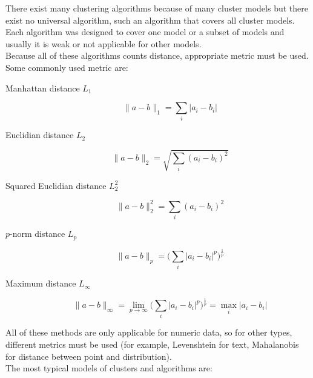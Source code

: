 There exist many clustering algorithms because of many cluster models but there exist no universal algorithm, such an algorithm that covers all cluster models. Each algorithm was designed to cover one model or a subset of models and usually it is weak or not applicable for other models.\\
Because all of these algorithms counts distance, appropriate metric must be used. Some commonly used metric are:
\begin{description}
\item[Manhattan distance $L_1$] $$\|a-b\|_1=\sum_i |a_i - b_i| $$
\item[Euclidian distance $L_2$] $$\|a-b\|_2=\sqrt{\sum_i (a_i - b_i)^2 }$$
\item[Squared Euclidian distance $L_2^2$] $$\|a-b\|_2^2=\sum_i (a_i - b_i)^2 $$
\item[$p$-norm distance $L_p$] $$\|a-b\|_p=\Big(\sum_i |a_i - b_i|^p\Big)^\frac{1}{p} $$
\item[Maximum distance $L_\infty$] $$\|a-b\|_\infty=\lim_{p\to\infty}\Big(\sum_i |a_i - b_i|^p\Big)^\frac{1}{p}=\max_i |a_i - b_i| $$
\end{description}
All of these methods are only applicable for numeric data, so for other types, different metrics must be used (for example, Levenshtein for text, Mahalanobis for distance between point and distribution).
\\
The most typical models of clusters and algorithms are:
